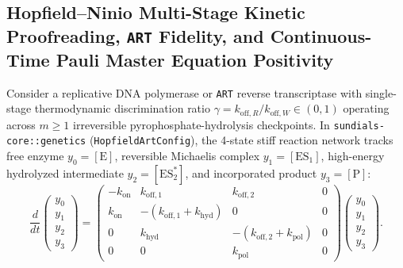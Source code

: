 \documentclass[11pt,a4paper]{article}
\theoremstyle{definition}
\begin{document}
\subsection{Hopfield--Ninio Multi-Stage Kinetic Proofreading, \texttt{ART} Fidelity, and Continuous-Time Pauli Master Equation Positivity}

Consider a replicative DNA polymerase or \texttt{ART} reverse transcriptase with single-stage thermodynamic discrimination ratio $\gamma = k_{\mathrm{off},R}/k_{\mathrm{off},W} \in (0,1)$ operating across $m \ge 1$ irreversible pyrophosphate-hydrolysis checkpoints. In \texttt{sundials-core::genetics} (\texttt{HopfieldArtConfig}), the 4-state stiff reaction network tracks free enzyme $y_0 = [\mathrm{E}]$, reversible Michaelis complex $y_1 = [\mathrm{ES}_1]$, high-energy hydrolyzed intermediate $y_2 = [\mathrm{ES}_2^*]$, and incorporated product $y_3 = [\mathrm{P}]$:
\begin{equation}
  \frac{d}{dt}\begin{pmatrix} y_0 \\ y_1 \\ y_2 \\ y_3 \end{pmatrix}
  = \begin{pmatrix}
    -k_{\mathrm{on}} & k_{\mathrm{off},1} & k_{\mathrm{off},2} & 0 \\
    k_{\mathrm{on}} & -(k_{\mathrm{off},1} + k_{\mathrm{hyd}}) & 0 & 0 \\
    0 & k_{\mathrm{hyd}} & -(k_{\mathrm{off},2} + k_{\mathrm{pol}}) & 0 \\
    0 & 0 & k_{\mathrm{pol}} & 0
  \end{pmatrix}
  \begin{pmatrix} y_0 \\ y_1 \\ y_2 \\ y_3 \end{pmatrix}.
\end{equation}
\end{document}
